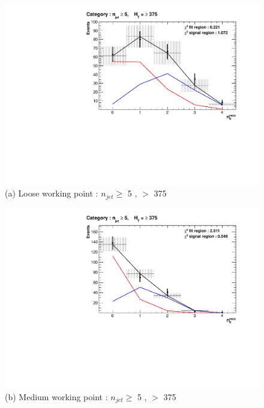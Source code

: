 \begin{figure}[ht]
\footnotesize
\centering
\begin{minipage}[b]{0.51 \linewidth}
\includegraphics[width = 1.0\linewidth]{plots/TemplatesSignal/Final_Fit_To_Data_Normal_Loose_HTBin_Template_375_jet_mult_5.pdf}
\centering (a) Loose working point : $n_{jet} \geq$  5 , \theht $>$ 375
\end{minipage}
\quad
\begin{minipage}[b]{0.51\linewidth}
\includegraphics[width = 1.0\linewidth]{plots/TemplatesSignal/Final_Fit_To_Data_Normal_Medium_HTBin_Template_375_jet_mult_5.pdf}
\centering (b) Medium working point : $n_{jet} \geq$ 5 , \theht $>$ 375 
\end{minipage}
\quad
\begin{minipage}[b]{0.51\linewidth}

\end{minipage}
\end{figure}
